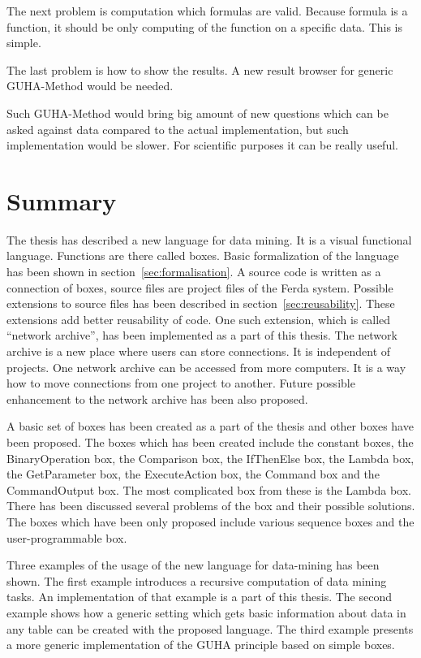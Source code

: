 \documentclass[a4paper,12pt]{book}
\begin{document}
The next problem is computation which formulas are valid. Because formula is a function, it should be only computing of the function on a specific data. This is simple.

The last problem is how to show the results. A new result browser for generic GUHA-Method would be needed.

Such GUHA-Method would bring big amount of new questions which can be asked against data compared to the actual implementation, but such implementation would be slower. For scientific purposes it can be really useful.

\chapter{Summary}
The thesis has described a new language for data mining. It is a visual functional language. Functions are there called boxes. Basic formalization of the language has been shown in section~\ref{sec:formalisation}. A source code is written as a connection of boxes, source files are project files of the Ferda system. Possible extensions to source files has been described in section~\ref{sec:reusability}. These extensions add better reusability of code. One such extension, which is called ``network archive'', has been implemented as a part of this thesis. The network archive is a new place where users can store connections. It is independent of projects. One network archive can be accessed from more computers. It is a way how to move connections from one project to another. Future possible enhancement to the network archive has been also proposed.

A basic set of boxes has been created as a part of the thesis and other boxes have been proposed. The boxes which has been created include the constant boxes, the BinaryOperation box, the Comparison box, the IfThenElse box, the Lambda box, the GetParameter box, the ExecuteAction box, the Command box and the CommandOutput box. The most complicated box from these is the Lambda box. There has been discussed several problems of the box and their possible solutions. The boxes which have been only proposed include various sequence boxes and the user-programmable box.

Three examples of the usage of the new language for data-mining has been shown. The first example introduces a recursive computation of data mining tasks. An implementation of that example is a part of this thesis. The second example shows how a generic setting which gets basic information about data in any table can be created with the proposed language. The third example presents a more generic implementation of the GUHA principle based on simple boxes.
\end{document}
